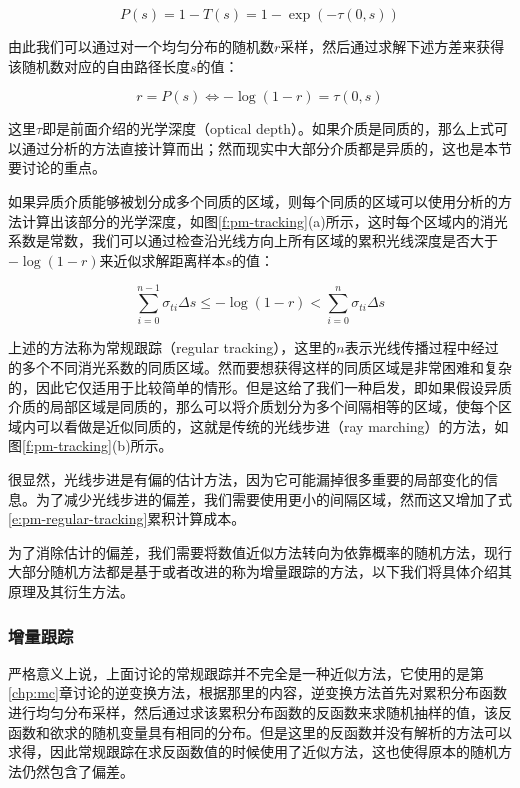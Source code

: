 \begin{equation}
	P(s)=1-T(s)=1-\exp(-\tau(0,s))
\end{equation}

由此我们可以通过对一个均匀分布的随机数$r$采样，然后通过求解下述方差来获得该随机数对应的自由路径长度$s$的值：

\begin{equation}\label{e:pm-free-path-random-number}
	r=P(s)\Leftrightarrow -\log(1-r)=\tau(0,s)
\end{equation}

这里$\tau$即是前面介绍的光学深度（optical depth）。如果介质是同质的，那么上式可以通过分析的方法直接计算而出；然而现实中大部分介质都是异质的，这也是本节要讨论的重点。

如果异质介质能够被划分成多个同质的区域，则每个同质的区域可以使用分析的方法计算出该部分的光学深度，如图\ref{f:pm-tracking}(a)所示，这时每个区域内的消光系数是常数，我们可以通过检查沿光线方向上所有区域的累积光线深度是否大于$-\log(1-r)$来近似求解距离样本$s$的值：

\begin{equation}\label{e:pm-regular-tracking}
	\sum^{n-1}_{i=0}\sigma_{ti}\Delta s\leq-\log(1-r)<\sum^{n}_{i=0}\sigma_{ti}\Delta s
\end{equation}

上述的方法称为常规跟踪（regular tracking），这里的$n$表示光线传播过程中经过的多个不同消光系数的同质区域。然而要想获得这样的同质区域是非常困难和复杂的，因此它仅适用于比较简单的情形。但是这给了我们一种启发，即如果假设异质介质的局部区域是同质的，那么可以将介质划分为多个间隔相等的区域，使每个区域内可以看做是近似同质的，这就是传统的光线步进（ray marching）的方法，如图\ref{f:pm-tracking}(b)所示。

很显然，光线步进是有偏的估计方法，因为它可能漏掉很多重要的局部变化的信息。为了减少光线步进的偏差，我们需要使用更小的间隔区域，然而这又增加了式\ref{e:pm-regular-tracking}累积计算成本。

为了消除估计的偏差，我们需要将数值近似方法转向为依靠概率的随机方法，现行大部分随机方法都是基于或者改进的称为增量跟踪的方法，以下我们将具体介绍其原理及其衍生方法。




\subsubsection{增量跟踪}\label{sec:pm-delta-tracking}
严格意义上说，上面讨论的常规跟踪并不完全是一种近似方法，它使用的是第\ref{chp:mc}章讨论的逆变换方法，根据那里的内容，逆变换方法首先对累积分布函数进行均匀分布采样，然后通过求该累积分布函数的反函数来求随机抽样的值，该反函数和欲求的随机变量具有相同的分布。但是这里的反函数并没有解析的方法可以求得，因此常规跟踪在求反函数值的时候使用了近似方法，这也使得原本的随机方法仍然包含了偏差。

